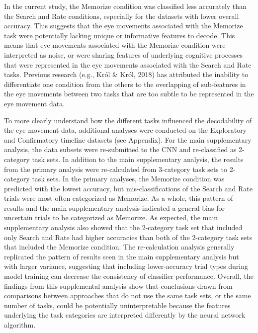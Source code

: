 \documentclass[
  english,
  man, donotrepeattitle,floatsintext]{apa6}
\begin{document}
In the current study, the Memorize condition was classified less accurately than the Search and Rate conditions, especially for the datasets with lower overall accuracy. This suggests that the eye movements associated with the Memorize task were potentially lacking unique or informative features to decode. This means that eye movements associated with the Memorize condition were interpreted as noise, or were sharing features of underlying cognitive processes that were represented in the eye movements associated with the Search and Rate tasks. Previous research (e.g., Król \& Król, 2018) has attributed the inability to differentiate one condition from the others to the overlapping of sub-features in the eye movements between two tasks that are too subtle to be represented in the eye movement data.

To more clearly understand how the different tasks influenced the decodability of the eye movement data, additional analyses were conducted on the Exploratory and Confirmatory timeline datasets (see Appendix). For the main supplementary analysis, the data subsets were re-submitted to the CNN and re-classified as 2-category task sets. In addition to the main supplementary analysis, the results from the primary analysis were re-calculated from 3-category task sets to 2-category task sets. In the primary analyses, the Memorize condition was predicted with the lowest accuracy, but mis-classifications of the Search and Rate trials were most often categorized as Memorize. As a whole, this pattern of results and the main supplementary analysis indicated a general bias for uncertain trials to be categorized as Memorize. As expected, the main supplementary analysis also showed that the 2-category task set that included only Search and Rate had higher accuracies than both of the 2-category task sets that included the Memorize condition. The re-calculation analysis generally replicated the pattern of results seen in the main supplementary analysis but with larger variance, suggesting that including lower-accuracy trial types during model training can decrease the consistency of classifier performance. Overall, the findings from this supplemental analysis show that conclusions drawn from comparisons between approaches that do not use the same task sets, or the same number of tasks, could be potentially uninterpretable because the features underlying the task categories are interpreted differently by the neural network algorithm.
\end{document}
